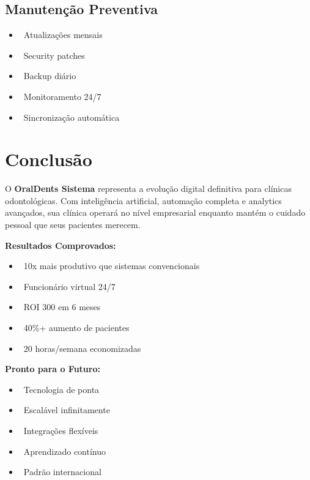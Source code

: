 \documentclass[11pt,a4paper]{article}
\newcommand{\sectiontitle}[1]{\section{\color{oraldentsblue}#1}}
\newcommand{\highlight}[1]{\textcolor{oraldentsblue}{\textbf{#1}}}
\begin{document}
\subsection{Manutenção Preventiva}
\begin{itemize}
    \item \faWrench\ Atualizações mensais
    \item \faShieldAlt\ Security patches
    \item \faDatabase\ Backup diário
    \item \faChartLine\ Monitoramento 24/7
    \item \faSync\ Sincronização automática
\end{itemize}

\sectiontitle{Conclusão}

\begin{tcolorbox}[colback=blue!5!white,colframe=oraldentsblue,title={\faTrophy\ Transformação Digital Completa}]
O \highlight{OralDents Sistema} representa a evolução digital definitiva para clínicas odontológicas. Com inteligência artificial, automação completa e analytics avançados, sua clínica operará no nível empresarial enquanto mantém o cuidado pessoal que seus pacientes merecem.

\textbf{Resultados Comprovados:}
\begin{itemize}
    \item \faRocket\ 10x mais produtivo que sistemas convencionais
    \item \faRobot\ Funcionário virtual 24/7
    \item \faChartLine\ ROI 300\+ em 6 meses
    \item \faUsers\ 40\%+ aumento de pacientes
    \item \faClock\ 20 horas/semana economizadas
\end{itemize}

\textbf{Pronto para o Futuro:}
\begin{itemize}
    \item \faMicrochip\ Tecnologia de ponta
    \item \faExpand\ Escalável infinitamente
    \item \faPuzzlePiece\ Integrações flexíveis
    \item \faGraduationCap\ Aprendizado contínuo
    \item \faGlobe\ Padrão internacional
\end{itemize}
\end{tcolorbox}
\end{document}
